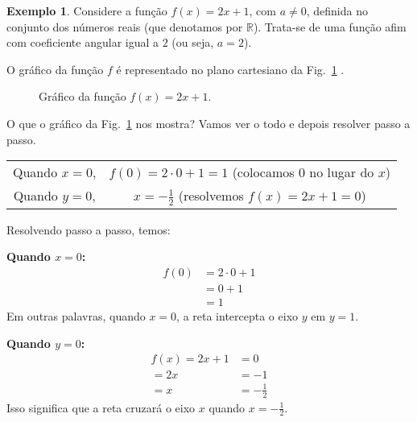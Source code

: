 \documentclass[12pt,openright,twoside,a4paper]{article}
\theoremstyle{definition}
\newtheorem{example}{Exemplo}[section]
\begin{document}
	\begin{example}\label{Ex:funcao_afim_1} Considere a função $f(x) = 2x + 1$, com $a \neq 0$, definida no conjunto dos números reais (que denotamos por $\mathbb{R}$).
		Trata-se de uma função afim com coeficiente angular igual a $2$ (ou seja, $a = 2$).
		
		O gráfico da função $f$ é representado no plano cartesiano da Fig.~\ref{fig:funcao_afim}
		.
		\begin{figure}[h]
			\centering
			\caption{Gráfico da função $f(x) = 2x + 1$.}
			\label{fig:funcao_afim}
		\end{figure}
	\end{example}
	
	O que o gráfico da Fig.~\ref{fig:funcao_afim} nos mostra? Vamos ver o todo e depois resolver passo a passo.
	
	\begin{tabular}{cc}
		Quando $x=0$,  & $f(0) = 2 \cdot 0 + 1 = 1$ (colocamos $0$ no lugar do $x$)\\
		Quando $y = 0$, & $x = -\displaystyle\frac{1}{2}$ (resolvemos $f(x) = 2x + 1 = 0$)
	\end{tabular}
	
	Resolvendo passo a passo, temos:
	
	\textbf{Quando $x=0$:}
	\begin{align*}
		f(0) &= 2 \cdot 0 + 1\\
		&= 0 + 1\\
		&= 1
	\end{align*}
	Em outras palavras, quando $x=0$, a reta intercepta o eixo $y$ em $y=1$.
	
	\textbf{Quando $y=0$:}
	\begin{align*}
		f(x) = 2x + 1 &= 0\\
		= 2x &= -1\\
		= x &= -\frac{1}{2}
	\end{align*}
	Isso significa que a reta cruzará o eixo $x$ quando $x= \displaystyle -\frac{1}{2}$.
	
\end{document}
